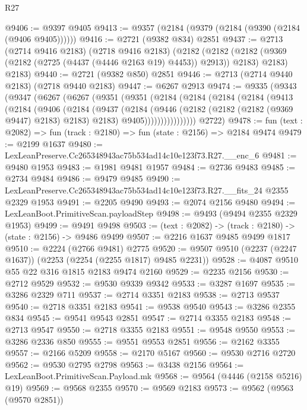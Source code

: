 \begin{lexlean}{R27}
\begin{coremodule}
@9406 := @9397 @9405
@9413 := @9357 (@2184 (@9379 (@2184 (@9390 (@2184 (@9406 @9405))))))
@9416 := @2721 (@9382 @834) @2851
@9437 := @2713
    (@2714 @9416 @2183)
    (@2718 @9416 @2183)
    (@2182
      (@2182 (@2182 (@9369 (@2182 (@2725 (@4437 (@4446 @2163 @19) @4453)) @2913)) @2183) @2183)
      @2183)
@9440 := @2721 (@9382 @850) @2851
@9446 := @2713 (@2714 @9440 @2183) (@2718 @9440 @2183)
@9447 := @6267 @2913
@9474 := @9335
    (@9343
      (@9347
        (@6267
          (@6267
            (@9351
              (@9351
                (@2184
                  (@2184
                    (@2184
                      (@2184
                        (@9413
                          (@2184
                            (@9406
                              (@2184
                                (@9437
                                  (@2184
                                    (@9446
                                      (@2182 (@2182 (@2182 (@9369 @9447) @2183) @2183) @2183)
                                      @9405))))))))))))))))
      @2722)
@9478 := fun (text : @2082) => fun (track : @2180) => fun (state : @2156) => @2184 @9474
@9479 := @2199 @1637
@9480 := LexLeanPreserve.Cc265348943ac75b534ad14c10e123f73.R27.__enc_6
@9481 := @9480 @1953
@9483 := @1981 @9481 @1957
@9484 := @2736 @9483
@9485 := @2734 @9484
@9486 := @9479 @9485
@9490 := LexLeanPreserve.Cc265348943ac75b534ad14c10e123f73.R27.__fits_24 @2355 @2329 @1953
@9491 := @2205 @9490
@9493 := @2074 @2156 @9480
@9494 := LexLeanBoot.PrimitiveScan.payloadStep
@9498 := @9493 (@9494 @2355 @2329 @1953)
@9499 := @9491 @9498
@9503 := (text : @2082) -> (track : @2180) -> (state : @2156) -> @9486 @9499
@9507 := @2216 @1637 @9485 @9499 @1817
@9510 := @2224 (@2766 @9481) @2775
@9520 := @9507 @9510 (@2237 (@2247 @1637)) (@2253 (@2254 (@2255 @1817) @9485 @2231))
@9528 := @4087 @9510 @55 @22 @316 @1815 @2183 @9474 @2160
@9529 := @2235 @2156
@9530 := @2712 @9529
@9532 := @9530 @9339 @9342
@9533 := @3287 @1697
@9535 := @3286 @2329 @711
@9537 := @2714 @3351 @2183
@9538 := @2713 @9537
@9540 := @2718 @3351 @2183
@9541 := @9538 @9540
@9543 := @3286 @2355 @834
@9545 := @9541 @9543 @2851
@9547 := @2714 @3355 @2183
@9548 := @2713 @9547
@9550 := @2718 @3355 @2183
@9551 := @9548 @9550
@9553 := @3286 @2336 @850
@9555 := @9551 @9553 @2851
@9556 := @2162 @3355
@9557 := @2166 @5209
@9558 := @2170 @5167
@9560 := @9530 @2716 @2720
@9562 := @9530 @2795 @2798
@9563 := @3438 @2156
@9564 := LexLeanBoot.PrimitiveScan.Payload.mk
@9568 := @9564 (@4446 (@2158 @5216) @19)
@9569 := @9568 @2355
@9570 := @9569 @2183
@9573 := @9562 (@9563 (@9570 @2851))

\end{coremodule}
\end{lexlean}
